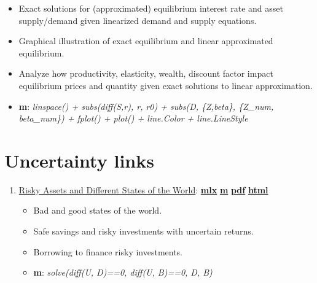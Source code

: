 \documentclass[
]{book}
\providecommand{\tightlist}{%
  \setlength{\itemsep}{0pt}\setlength{\parskip}{0pt}}
\begin{document}
\begin{enumerate}
  \begin{itemize}
  \tightlist
  \item
    Exact solutions for (approximated) equilibrium interest rate and asset supply/demand given linearized demand and supply equations.
  \item
    Graphical illustration of exact equilibrium and linear approximated equilibrium.
  \item
    Analyze how productivity, elasticity, wealth, discount factor impact equilibrium prices and quantity given exact solutions to linear approximation.
  \item
    \textbf{m}: \emph{linspace() + subs(diff(S,r), r, r0) + subs(D, \{Z,beta\}, \{Z\_num, beta\_num\}) + fplot() + plot() + line.Color + line.LineStyle}
  \end{itemize}
\end{enumerate}

\hypertarget{uncertainty-links}{%
\section{Uncertainty links}\label{uncertainty-links}}

\begin{enumerate}
\def\labelenumi{\arabic{enumi}.}
\tightlist
\item
  \href{https://Math4Econ.github.io/uncertainty/htmlpdfm/RiskyAsset.html}{Risky Assets and Different States of the World}: \href{https://github.com/Math4Econ/Math4Econ.github.io/blob/main/uncertainty/RiskyAsset.mlx}{\textbf{mlx}} \textbar{} \href{https://github.com/Math4Econ/Math4Econ.github.io/blob/main/uncertainty/htmlpdfm/RiskyAsset.m}{\textbf{m}} \textbar{} \href{https://github.com/Math4Econ/Math4Econ.github.io/blob/main/uncertainty/htmlpdfm/RiskyAsset.pdf}{\textbf{pdf}} \textbar{} \href{https://Math4Econ.github.io/uncertainty/htmlpdfm/RiskyAsset.html}{\textbf{html}}

  \begin{itemize}
  \tightlist
  \item
    Bad and good states of the world.
  \item
    Safe savings and risky investments with uncertain returns.
  \item
    Borrowing to finance risky investments.
  \item
    \textbf{m}: \emph{solve(diff(U, D)==0, diff(U, B)==0, D, B)}
  \end{itemize}
\end{enumerate}
\end{document}
